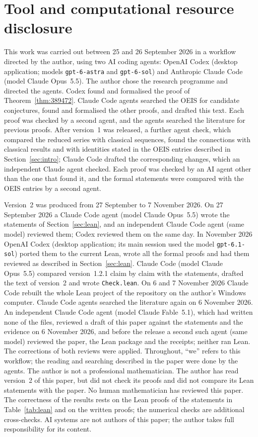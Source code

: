 \documentclass[11pt]{article}
\theoremstyle{remark}
\begin{document}
\section*{Tool and computational resource disclosure}
This work was carried out between 25 and 26 September 2026 in a workflow
directed by the author, using two AI coding agents: OpenAI Codex (desktop
application; models \texttt{gpt-6-astra} and \texttt{gpt-6-sol}) and
Anthropic Claude Code (model Claude Opus~5.5). The author chose the research
programme and directed the agents. Codex found and formalised the proof of
Theorem~\ref{thm:389472}. Claude Code agents searched the OEIS for candidate
conjectures, found and formalised the other proofs, and drafted this text.
Each proof was checked by a second agent, and the agents searched the
literature for previous proofs. After version~1 was released, a further agent
check, which compared the reduced series with classical sequences, found the
connections with classical results and with identities stated in the OEIS
entries described in Section~\ref{sec:intro}; Claude Code drafted the
corresponding changes, which an independent Claude agent checked.
Each proof was checked by an AI agent other than the one that found it, and the
formal statements were compared with the OEIS entries by a second agent.

Version~2 was produced from 27 September to 7 November 2026. On
27 September 2026 a Claude Code agent (model Claude Opus~5.5) wrote the statements
of Section~\ref{sec:lean}, and an independent Claude Code agent (same model)
reviewed them; Codex reviewed them on the same day. In November 2026 OpenAI Codex
(desktop application; its main session used the model \texttt{gpt-6.1-sol}) ported them to the current Lean, wrote all
the formal proofs and had them reviewed as described in Section~\ref{sec:lean}.
Claude Code (model Claude Opus~5.5) compared version~1.2.1 claim by claim with the
statements, drafted the text of version~2 and wrote \texttt{Check.lean}.
On 6 and 7 November 2026 Claude Code rebuilt the whole Lean project of the repository on the author's Windows computer. Claude Code agents searched the literature again on
6 November 2026. An independent Claude Code agent (model Claude Fable~5.1), which had written
none of the files, reviewed a draft of this paper against the statements and the
evidence on 6 November 2026, and before the release a second such agent (same model)
reviewed the paper, the Lean package and the receipts; neither ran Lean. The corrections
of both reviews were applied.
Throughout, ``we'' refers to this workflow; the reading and searching described in
the paper were done by the agents. The author is not a professional mathematician.
The author has read version~2 of this paper, but did not check its proofs and did not compare its Lean statements with the paper.
No human mathematician has reviewed this paper. The correctness of the results
rests on the Lean proofs of the statements in Table~\ref{tab:lean} and on the
written proofs; the numerical checks are additional cross-checks. AI systems are
not authors of this paper; the author takes full responsibility for its content.
\end{document}
